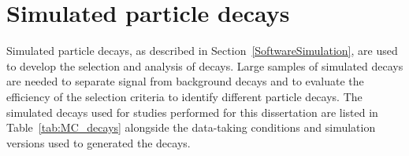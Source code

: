 \section{Simulated particle decays}
\label{sec:MCsamples}
Simulated particle decays, as described in Section~\ref{SoftwareSimulation}, are used to develop the selection and analysis of \bmumu decays. Large samples of simulated decays are needed to separate signal from background decays and to evaluate the efficiency of the selection criteria to identify different particle decays. 
The simulated decays used for studies performed for this dissertation are listed in Table~\ref{tab:MC_decays} alongside the data-taking conditions and simulation versions used to generated the decays.



